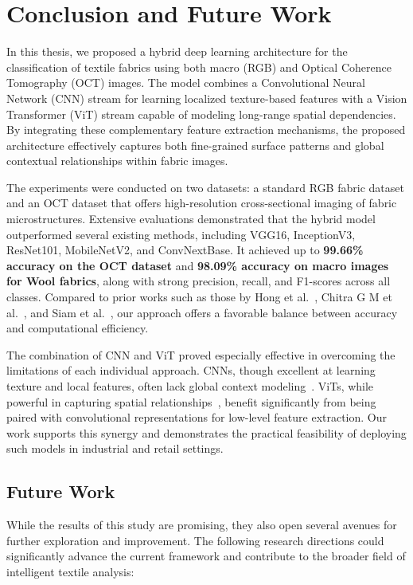 \section{Conclusion and Future Work}

In this thesis, we proposed a hybrid deep learning architecture for the classification of textile fabrics using both macro (RGB) and Optical Coherence Tomography (OCT) images. The model combines a Convolutional Neural Network (CNN) stream for learning localized texture-based features with a Vision Transformer (ViT) stream capable of modeling long-range spatial dependencies. By integrating these complementary feature extraction mechanisms, the proposed architecture effectively captures both fine-grained surface patterns and global contextual relationships within fabric images.

The experiments were conducted on two datasets: a standard RGB fabric dataset and an OCT dataset that offers high-resolution cross-sectional imaging of fabric microstructures. Extensive evaluations demonstrated that the hybrid model outperformed several existing methods, including VGG16, InceptionV3, ResNet101, MobileNetV2, and ConvNextBase. It achieved up to \textbf{99.66\% accuracy on the OCT dataset} and \textbf{98.09\% accuracy on macro images for Wool fabrics}, along with strong precision, recall, and F1-scores across all classes. Compared to prior works such as those by Hong et al.~\cite{hong2024research}, Chitra G M et al.~\cite{chitra2023fabric}, and Siam et al.~\cite{siam2023textilenet}, our approach offers a favorable balance between accuracy and computational efficiency.

The combination of CNN and ViT proved especially effective in overcoming the limitations of each individual approach. CNNs, though excellent at learning texture and local features, often lack global context modeling~\cite{simonyan2015vgg}. ViTs, while powerful in capturing spatial relationships~\cite{dosovitskiy2020vit}, benefit significantly from being paired with convolutional representations for low-level feature extraction. Our work supports this synergy and demonstrates the practical feasibility of deploying such models in industrial and retail settings.

\subsection*{Future Work}

While the results of this study are promising, they also open several avenues for further exploration and improvement. The following research directions could significantly advance the current framework and contribute to the broader field of intelligent textile analysis:


